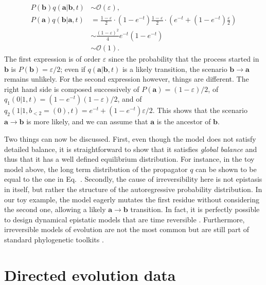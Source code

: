 \begin{equation}
\begin{split}
	P(\mathbf{b})q(\mathbf{a}\vert \mathbf{b}, t) &\sim \mathcal{O}(\varepsilon),\\
	P(\mathbf{a})q(\mathbf{b}\vert \mathbf{a}, t) &=  \frac{1-\varepsilon}{2}\cdot(1-e^{-t})\frac{1-\varepsilon}{2}\cdot\left( e^{-t} + (1-e^{-t}) \frac{\varepsilon}{2}\right)\\
	& \sim \frac{(1-\varepsilon)^2}{4}e^{-t}(1-e^{-t})\\ 
	&\sim \mathcal{O}(1).
\end{split}
\end{equation}
The first expression is of order $\varepsilon$ since the probability that the process started in $\mathbf{b}$ is $P(\mathbf{b}) = \varepsilon/2$; even if $q(\mathbf{a}\vert \mathbf{b}, t)$ is a likely transition, the scenario $\mathbf{b} \rightarrow \mathbf{a}$ remains unlikely. 
For the second expression however, things are different. 
The right hand side is composed successively of $P(\mathbf{a}) = (1-\varepsilon)/2$, of $q_1(0 \vert 1, t) = (1-e^{-t})(1-\varepsilon)/2$, and of $q_2(1 \vert 1, b_{<2}=(0), t) = e^{-t} + (1-e^{-t}) \varepsilon/2$.
This shows that the scenario $\mathbf{a} \rightarrow \mathbf{b}$ is more likely, and we can assume that $\mathbf{a}$ is the ancestor of $\mathbf{b}$. 

Two things can now be discussed. 
First, even though the model does not satisfy detailed balance, it is straightforward to show that it satisfies \emph{global balance} and thus that it has a well defined equilibrium distribution. 
For instance, in the toy model above, the long term distribution of the propagator $q$ can be shown to be equal to the one in Eq.~. 
Secondly, the cause of irreversibility here is not epistasis in itself, but rather the structure of the autoregressive probability distribution. 
In our toy example, the model eagerly mutates the first residue without considering the second one, allowing a likely $\mathbf{a} \rightarrow \mathbf{b}$ transition. 
In fact, it is perfectly possible to design dynamical epistatic models that are time reversible \cite{alvarez_vivofunctionalphenotypes_2024}. 
Furthermore, irreversible models of evolution are not the most common but are still part of standard phylogenetic toolkits \cite{boussau_efficientlikelihoodcomputations_2006}. 



\section{Directed evolution data} %
\label{sec:directed_evolution_data}

